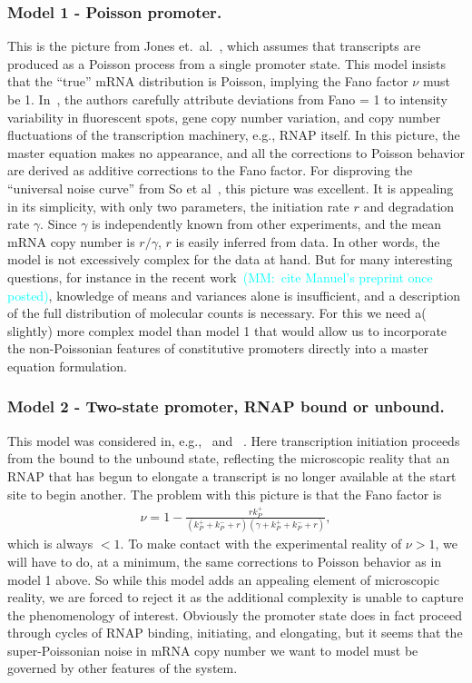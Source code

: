 \documentclass[12pt]{article}%
\newcommand{\rate}[3]{{#1}_{#2}^{#3}}
\newcommand{\mmnote}[1]{\textcolor{cyan}{(MM:~#1)}}
\begin{document}
\subsubsection{Model 1 - Poisson promoter.}
This is the picture from Jones et.\ al.~\cite{Jones2014}, which
assumes that transcripts are produced as a Poisson process from a
single promoter state. This model insists that the ``true'' mRNA
distribution is Poisson, implying the Fano factor $\nu$ must be 1.
In~\cite{Jones2014}, the authors carefully attribute deviations
from Fano = 1 to intensity variability in fluorescent spots, gene
copy number variation, and copy number fluctuations of the
transcription machinery, e.g., RNAP itself.
In this picture, the master equation makes no appearance,
and all the corrections to Poisson behavior are derived
as additive corrections to the Fano factor.
For disproving the ``universal noise curve'' from So et
al~\cite{So2011}, this picture was excellent. It is appealing in
its simplicity, with only two parameters, the initiation rate $r$
and degradation rate $\gamma$. Since $\gamma$ is independently
known from other experiments, and the mean mRNA copy number is
$r/\gamma$, $r$ is easily inferred from data.
In other words, the model is not excessively complex for the data at hand.
But for many interesting questions, for instance in the recent
work~\mmnote{cite Manuel's preprint once posted},
knowledge of means and variances alone is insufficient, and a
description of the full distribution of molecular counts is necessary.
For this we need a( slightly) more complex model than model 1
that would allow us to incorporate the non-Poissonian features of
constitutive promoters directly into a master equation formulation.

\subsubsection{Model 2 - Two-state promoter, RNAP bound or unbound.}
This model was considered in, e.g.,~\cite{Phillips2015a} and ~\cite{Phillips2019}.
Here transcription initiation proceeds from the bound to the unbound state,
reflecting the microscopic reality that an RNAP that has begun to elongate
a transcript is no longer available at the start site to begin another.
The problem with this picture is that the Fano factor is
\begin{align}
    \nu = 1 -
        \frac{r\rate{k}{P}{+}}
            {\left(\rate{k}{P}{+} + \rate{k}{P}{-} + r\right)
             \left(\gamma + \rate{k}{P}{+} + \rate{k}{P}{-} + r\right)},
\end{align}
which is always $<1$.
To make contact with the experimental reality of $\nu>1$,
we will have to do, at a minimum,
the same corrections to Poisson behavior as in model 1 above.
So while this model adds an appealing element of microscopic
reality, we are forced to reject it as the additional complexity
is unable to capture the phenomenology of interest.
Obviously the promoter state does in fact proceed through cycles
of RNAP binding, initiating, and elongating, but it seems that
the super-Poissonian noise in mRNA copy number we want to
model must be governed by other features of the system.
\end{document}
